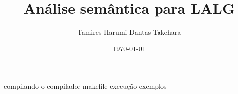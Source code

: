 \documentclass[a4paper]{article}
\title{Análise semântica para LALG}
\author{Tamires Harumi Dantas Takehara}
\date{\today}
\begin{document}
	\maketitle
	
	
	
	compilando o compilador
		makefile
		execução
		exemplos
\end{document}
